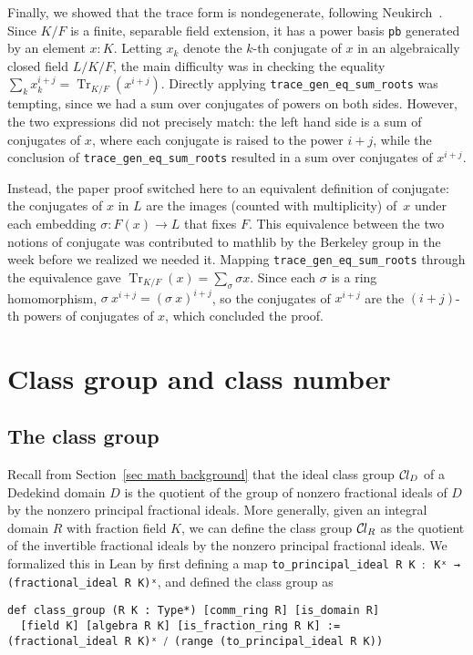 \documentclass[sn-mathphys]{sn-jnl}%
\newcommand{\lean}[1]{\texttt{#1}\xspace}
\newcommand*{\Cl}{\mathcal{C}\kern-.075em l}
\DeclareMathOperator{\Tr}{Tr}
\newcommand{\mathlib}{\textsf{mathlib}\xspace}
\begin{document}
Finally, we showed that the trace form is nondegenerate, following Neu\-kirch~\cite[Proposition~2.8]{Neukirch}.
Since $K / F$ is a finite, separable field extension, it has a power basis \lean{pb} generated by an element $x : K$.
Letting $x_k$ denote the $k$-th conjugate of $x$ in an algebraically closed field $L / K / F$,
the main difficulty was in checking the equality $\sum_k x_k^{i + j} = \Tr_{K / F} (x^{i + j})$.
Directly applying \lean{trace\_gen\_eq\_sum\_roots} was tempting, since we had a sum over conjugates of powers on both sides.
However, the two expressions did not precisely match: the left hand side is a sum of conjugates of $x$, where each conjugate is raised to the power $i + j$,
while the conclusion of \lean{trace\_gen\_eq\_sum\_roots} resulted in a sum over conjugates of $x^{i + j}$.

Instead, the paper proof switched here to an equivalent definition of conjugate:
the conjugates of $x$ in $L$ are the images (counted with multiplicity) of~$x$ under each embedding $\sigma \colon F(x) \to L$ that fixes $F$. This equivalence between the two notions of conjugate was contributed to \mathlib by the Berkeley group in the week before we realized we needed it. Mapping \lean{trace\_gen\_eq\_sum\_roots} through the equivalence gave
$\Tr_{K / F}(x) = \sum_{\sigma} \sigma x$.
Since each $\sigma$ is a ring homomorphism, $\sigma\ x^{i + j} = (\sigma\ x)^{i + j}$,
so the conjugates of $x^{i + j}$ are the $(i + j)$-th powers of conjugates of $x$, which concluded the proof.

\section{Class group and class number} \label{sec:class-number}

\subsection{The class group}\label{subsec:class_group}

Recall from Section~\ref{sec math background} that the ideal class group $\Cl_D$ of a Dedekind domain $D$ is the quotient of the group of nonzero fractional ideals of $D$ by the nonzero principal fractional ideals.
More generally, given an integral domain $R$ with fraction field $K$,
we can define the class group $\Cl_R$ as the quotient of the invertible fractional ideals by the nonzero principal fractional ideals.
We formalized this in Lean by first defining a map \lean{to\_principal\_ideal R K $:$ Kˣ → (fractional\_ideal R K)ˣ},
and defined the class group as
\begin{lstlisting}
def class_group (R K : Type*) [comm_ring R] [is_domain R]
  [field K] [algebra R K] [is_fraction_ring R K] :=
(fractional_ideal R K)ˣ ⧸ (range (to_principal_ideal R K))
\end{lstlisting}
\end{document}
